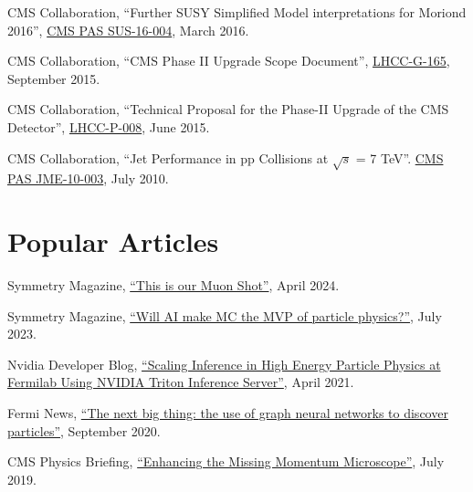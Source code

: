 \begin{description}[leftmargin=12pt,font=\normalfont,labelsep=0em]
\item CMS Collaboration, ``Further SUSY Simplified Model interpretations for Moriond 2016'', \href{http://cds.cern.ch/record/2140312}{CMS PAS SUS-16-004}, March 2016. %
\item CMS Collaboration, ``CMS Phase II Upgrade Scope Document'', \href{https://cds.cern.ch/record/2055167}{LHCC-G-165}, September 2015.
\item CMS Collaboration, ``Technical Proposal for the Phase-II Upgrade of the CMS Detector'', \href{http://cds.cern.ch/record/2020886}{LHCC-P-008}, June 2015. %
\item CMS Collaboration, ``Jet Performance in pp Collisions at $\sqrt{s}$ = 7 TeV''. \href{http://cds.cern.ch/record/1279362}{CMS PAS JME-10-003}, July 2010. %
\end{description}

\section{Popular Articles}
\begin{description}[leftmargin=12pt,font=\normalfont,labelsep=0em]
\item Symmetry Magazine, \href{https://www.symmetrymagazine.org/article/this-is-our-muon-shot}{``This is our Muon Shot''}, April 2024.
\item Symmetry Magazine, \href{https://www.symmetrymagazine.org/article/will-ai-make-mc-the-mvp-of-particle-physics}{``Will AI make MC the MVP of particle physics?''}, July 2023.
\item Nvidia Developer Blog, \href{https://developer.nvidia.com/blog/scaling-inference-in-high-energy-particle-physics-at-fermilab-using-nvidia-triton-inference-server/}{``Scaling Inference in High Energy Particle Physics at Fermilab Using NVIDIA Triton Inference Server''}, April 2021.
\item Fermi News, \href{https://news.fnal.gov/2020/09/the-next-big-thing-the-use-of-graph-neural-networks-to-discover-particles/}{``The next big thing: the use of graph neural networks to discover particles''}, September 2020.
\item CMS Physics Briefing, \href{https://cms.cern/news/enhancing-missing-momentum-microscope}{``Enhancing the Missing Momentum Microscope''}, July 2019.
\end{description}

\ifdefined\longflag
{}
